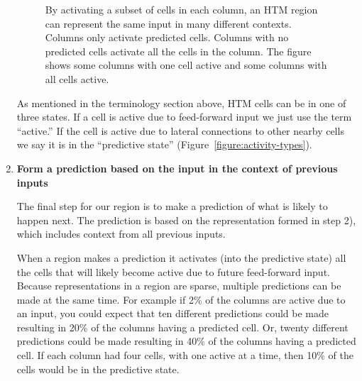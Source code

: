 \documentclass{report}
\begin{document}
\begin{enumerate}
\begin{figure}
\caption{By activating a subset of cells in each column, an HTM region
  can represent the same input in many different contexts. Columns
  only activate predicted cells. Columns with no predicted cells
  activate all the cells in the column. The figure shows some columns
  with one cell active and some columns with all cells active.}
\label{figure:column-partial-activation}
\end{figure}

As mentioned in the terminology section above, HTM cells can be in one
of three states. If a cell is active due to feed-forward input we just
use the term ``active.'' If the cell is active due to lateral
connections to other nearby cells we say it is in the ``predictive
state'' (Figure~\ref{figure:activity-types}).

\item {\bf Form a prediction based on the input in the context of
  previous inputs}

The final step for our region is to make a prediction of what is
likely to happen next. The prediction is based on the representation
formed in step 2), which includes context from all previous inputs.

When a region makes a prediction it activates (into the predictive
state) all the cells that will likely become active due to future
feed-forward input. Because representations in a region are sparse,
multiple predictions can be made at the same time. For example if 2\%
of the columns are active due to an input, you could expect that ten
different predictions could be made resulting in 20\% of the columns
having a predicted cell. Or, twenty different predictions could be
made resulting in 40\% of the columns having a predicted cell. If each
column had four cells, with one active at a time, then 10\% of the
cells would be in the predictive state.


\end{enumerate}
\end{document}
